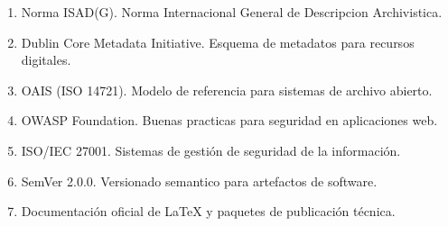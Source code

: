 \begin{enumerate}
  \item Norma ISAD(G). Norma Internacional General de Descripcion Archivistica.
  \item Dublin Core Metadata Initiative. Esquema de metadatos para recursos digitales.
  \item OAIS (ISO 14721). Modelo de referencia para sistemas de archivo abierto.
  \item OWASP Foundation. Buenas practicas para seguridad en aplicaciones web.
  \item ISO/IEC 27001. Sistemas de gestión de seguridad de la información.
  \item SemVer 2.0.0. Versionado semantico para artefactos de software.
  \item Documentación oficial de LaTeX y paquetes de publicación técnica.
\end{enumerate}
